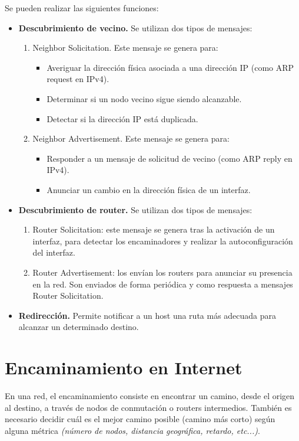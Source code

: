 \begin{onepage}
Se pueden realizar las siguientes funciones:
\begin{itemize}
    \item \textbf{Descubrimiento de vecino.} Se utilizan dos tipos de mensajes:
    \begin{enumerate}
        \item Neighbor Solicitation.
        Este mensaje se genera para:
        \begin{itemize}
            \item Averiguar la dirección física asociada a una dirección IP (como ARP request en IPv4).
            \item Determinar si un nodo vecino sigue siendo alcanzable.
            \item Detectar si la dirección IP está duplicada.
        \end{itemize}
        \item Neighbor Advertisement.
        Este mensaje se genera para:
        \begin{itemize}
            \item Responder a un mensaje de solicitud de vecino (como ARP reply en IPv4).
            \item Anunciar un cambio en la dirección física de un interfaz.
        \end{itemize}
    \end{enumerate}
    \item \textbf{Descubrimiento de router.} Se utilizan dos tipos de mensajes:
    \begin{enumerate}
        \item Router Solicitation: este mensaje se genera tras la activación de un interfaz, para detectar los encaminadores y realizar la autoconfiguración del interfaz.
        \item Router Advertisement: los envían los routers para anunciar su presencia en la red. Son enviados de forma periódica y como respuesta a mensajes Router Solicitation.
    \end{enumerate}
    \item \textbf{Redirección.} Permite notificar a un host una ruta más adecuada para alcanzar un determinado destino.
\end{itemize}
\end{onepage}
\section{Encaminamiento en Internet}
En una red, el encaminamiento consiste en encontrar un camino, desde el origen al destino, a través de nodos de conmutación o routers intermedios. También es necesario decidir cuál es el mejor camino posible (camino más corto) según alguna métrica \textit{(número de nodos, distancia geográfica, retardo, etc...)}.\\

